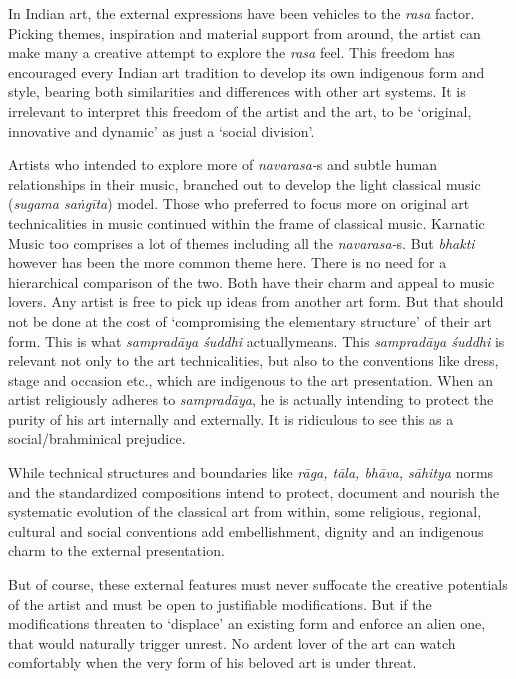 In Indian art, the external expressions have been vehicles to the \textit{rasa} factor. Picking themes, inspiration and material support from around, the artist can make many a creative attempt to explore the \textit{rasa} feel. This freedom has encouraged every Indian art tradition to develop its own indigenous form and style, bearing both similarities and differences with other art systems. It is irrelevant to interpret this freedom of the artist and the art, to be ‘original, innovative and dynamic’ as just a ‘social division’.

Artists who intended to explore more of \textit{navarasa-}s and subtle human relationships in their music, branched out to develop the light classical music (\textit{sugama saṅgīta}) model. Those who preferred to focus more on original art technicalities in music continued within the frame of classical music. Karnatic Music too comprises a lot of themes including all the \textit{navarasa-}s. But \textit{bhakti} however has been the more common theme here. There is no need for a hierarchical comparison of the two. Both have their charm and appeal to music lovers. Any artist is free to pick up ideas from another art form. But that should not be done at the cost of ‘compromising the elementary structure’ of their art form. This is what \textit{sampradāya śuddhi} actuallymeans. This \textit{sampradāya śuddhi} is relevant not only to the art technicalities, but also to the conventions like dress, stage and occasion etc., which are indigenous to the art presentation. When an artist religiously adheres to \textit{sampradāya}, he is actually intending to protect the purity of his art internally and externally. It is ridiculous to see this as a social/brahminical prejudice.

While technical structures and boundaries like \textit{rāga, tāla, bhāva, sāhitya} norms and the standardized compositions intend to protect, document and nourish the systematic evolution of the classical art from within, some religious, regional, cultural and social conventions add embellishment, dignity and an indigenous charm to the external presentation.

But of course, these external features must never suffocate the creative potentials of the artist and must be open to justifiable modifications. But if the modifications threaten to ‘displace’ an existing form and enforce an alien one, that would naturally trigger unrest. No ardent lover of the art can watch comfortably when the very form of his beloved art is under threat.

